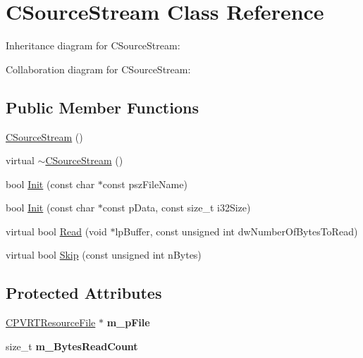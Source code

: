 \hypertarget{class_c_source_stream}{\section{C\+Source\+Stream Class Reference}
\label{class_c_source_stream}
}


Inheritance diagram for C\+Source\+Stream\+:


Collaboration diagram for C\+Source\+Stream\+:
\subsection*{Public Member Functions}
\begin{DoxyCompactItemize}
\item 
\hyperlink{class_c_source_stream_ab50a94d7e826979e9b3f23a1b310606b}{C\+Source\+Stream} ()
\item 
virtual \hyperlink{class_c_source_stream_ac105ec1ab61111e95b8b59ddbdbcc61e}{$\sim$\+C\+Source\+Stream} ()
\item 
bool \hyperlink{class_c_source_stream_ab0ebb0e543b50e391d1e73a8cf40162e}{Init} (const char $\ast$const psz\+File\+Name)
\item 
bool \hyperlink{class_c_source_stream_a40c5ae98a978ea0c509174843e71c02e}{Init} (const char $\ast$const p\+Data, const size\+\_\+t i32\+Size)
\item 
virtual bool \hyperlink{class_c_source_stream_aa703cd695da4e14d41aa7c5e7b803891}{Read} (void $\ast$lp\+Buffer, const unsigned int dw\+Number\+Of\+Bytes\+To\+Read)
\item 
virtual bool \hyperlink{class_c_source_stream_a0888527eea170af4867442dab2fa83f7}{Skip} (const unsigned int n\+Bytes)
\end{DoxyCompactItemize}
\subsection*{Protected Attributes}
\begin{DoxyCompactItemize}
\item 
\hypertarget{class_c_source_stream_a8942a009614a26552ea08aee96cdb542}{\hyperlink{class_c_p_v_r_t_resource_file}{C\+P\+V\+R\+T\+Resource\+File} $\ast$ {\bfseries m\+\_\+p\+File}}\label{class_c_source_stream_a8942a009614a26552ea08aee96cdb542}

\item 
\hypertarget{class_c_source_stream_a9d8192dadedd6ee57b9420957adf5f20}{size\+\_\+t {\bfseries m\+\_\+\+Bytes\+Read\+Count}}\label{class_c_source_stream_a9d8192dadedd6ee57b9420957adf5f20}

\end{DoxyCompactItemize}


